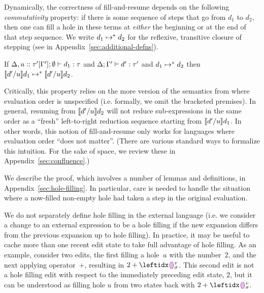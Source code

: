 Dynamically, the correctness of fill-and-resume depends on
the following \emph{commutativity} property: if there is some sequence of
steps that go from $d_1$ to $d_2$, then one can fill a hole in these
terms at \emph{either} the beginning or at the end of that step
sequence.
%
We write $d_1 \mapsto^* d_2$ for the reflexive,
transitive closure of stepping (see  in
Appendix~\ref{sec:additional-defns}).
%
\begin{thm}[Commutativity]
  If $\Delta, u :: \tau'[\Gamma']; \emptyset \vdash d_1 : \tau$
  and $\Delta; \Gamma' \vdash d' : \tau'$ and $d_1 \mapsto^* d_2$
  then $\llbracket d' / u\rrbracket d_1 \mapsto^* \llbracket d' / u\rrbracket d_2$.
\end{thm}
%
Critically, this property relies on the more version of
the semantics from  where evaluation order is
unspecified (i.e. formally, we omit the bracketed premises).
%
In general, resuming from $\llbracket d' / u\rrbracket d_2$ will not
reduce sub-expressions in the same order as a ``fresh'' left-to-right
reduction sequence starting from $\llbracket d' / u\rrbracket d_1$.
%
In other words, this notion of fill-and-resume only works for
languages where evaluation order ``does not matter''.
(There are various standard ways to formalize this intuition.
For the sake of space, we review these in Appendix~\ref{sec:confluence}.)


We describe the proof, which involves a
number of lemmas and definitions, in Appendix~\ref{sec:hole-filling}.
%
In particular, care is needed to handle the situation where a
now-filled non-empty hole had taken a step in the original evaluation.


We do not separately define hole filling in the external language
(i.e. we consider a change to an external expression to be a hole filling if the new expansion differs from
the previous expansion up to hole filling).
In practice, it may be useful to cache more than one recent edit state
to take full advantage of hole filling.
As an example, consider two edits, the first filling a hole~$u$ with
the number~$2$, and the next applying operator~$+$, resulting in $2
+ \dehole{v}{\sigma}{}$.
%
This second edit is not a hole filling edit with respect to the
immediately preceding edit state, $2$, but it can be understood as filling
hole $u$ from two states back with $2 + \dehole{v}{\sigma}{}$.

